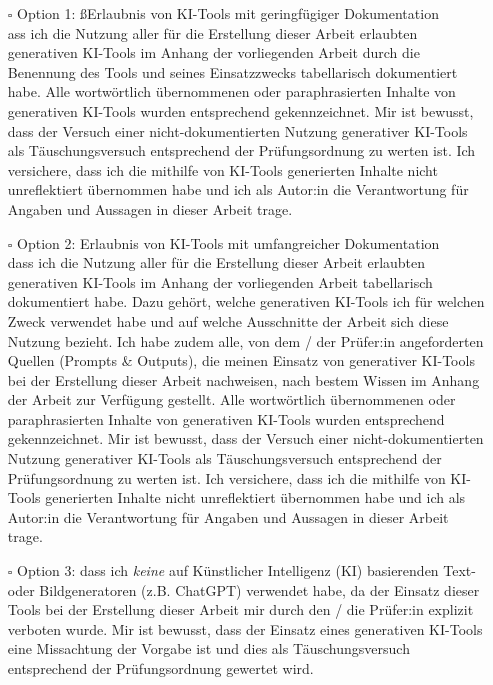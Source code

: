 \begin{itemize}
    \item[\rlap{\raisebox{0.3ex}{\hspace{0.4ex}\scriptsize \ding{56}}}$\square$] Option 1: ßErlaubnis von KI-Tools mit geringfügiger Dokumentation\\ ass ich die Nutzung aller für die Erstellung dieser Arbeit erlaubten generativen KI-Tools im Anhang der vorliegenden Arbeit durch die Benennung des Tools und seines Einsatzzwecks tabellarisch dokumentiert habe. Alle wortwörtlich übernommenen oder paraphrasierten Inhalte von generativen KI-Tools wurden entsprechend gekennzeichnet. Mir ist bewusst, dass der Versuch einer nicht-dokumentierten Nutzung generativer KI-Tools als Täuschungsversuch entsprechend der Prüfungsordnung zu werten ist. Ich versichere, dass ich die mithilfe von KI-Tools generierten Inhalte nicht unreflektiert übernommen habe und ich als Autor:in die Verantwortung für Angaben und Aussagen in dieser Arbeit trage.
    \item[$\square$] Option 2: Erlaubnis von KI-Tools mit umfangreicher Dokumentation\\ dass ich die Nutzung aller für die Erstellung dieser Arbeit erlaubten generativen KI-Tools im Anhang der vorliegenden Arbeit tabellarisch dokumentiert habe. Dazu gehört, welche generativen KI-Tools ich für welchen Zweck verwendet habe und auf welche Ausschnitte der Arbeit sich diese Nutzung bezieht. Ich habe zudem alle, von dem / der Prüfer:in angeforderten Quellen (Prompts \& Outputs), die meinen Einsatz von generativer KI-Tools bei der Erstellung dieser Arbeit nachweisen, nach bestem Wissen im Anhang der Arbeit zur Verfügung gestellt. Alle wortwörtlich übernommenen oder paraphrasierten Inhalte von generativen KI-Tools wurden entsprechend gekennzeichnet. Mir ist bewusst, dass der Versuch einer nicht-dokumentierten Nutzung generativer KI-Tools als Täuschungsversuch entsprechend der Prüfungsordnung zu werten ist. Ich versichere, dass ich die mithilfe von KI-Tools generierten Inhalte nicht unreflektiert übernommen habe und ich als Autor:in die Verantwortung für Angaben und Aussagen in dieser Arbeit trage.
    \item[$\square$] Option 3: dass ich \textit{keine} auf Künstlicher Intelligenz (KI) basierenden Text- oder Bildgeneratoren (z.B. ChatGPT) verwendet habe, da der Einsatz dieser Tools bei der Erstellung dieser Arbeit mir durch den / die Prüfer:in explizit verboten wurde. Mir ist bewusst, dass der Einsatz eines generativen KI-Tools eine Missachtung der Vorgabe ist und dies als Täuschungsversuch entsprechend der Prüfungsordnung gewertet wird.
\end{itemize}
